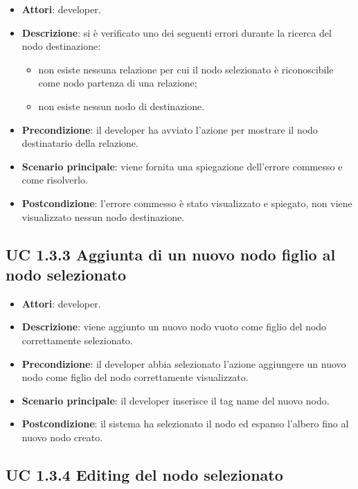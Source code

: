 		\begin{itemize}
			\item\textbf{Attori}: developer.
			\item\textbf{Descrizione}: si è verificato uno dei seguenti errori durante la ricerca del nodo destinazione:
			\begin{itemize}
				\item non esiste nessuna relazione per cui il nodo selezionato è riconoscibile come nodo partenza di una relazione;
				\item non esiste nessun nodo di destinazione.
			\end{itemize}
			\item\textbf{Precondizione}: il developer ha avviato l'azione per mostrare il nodo destinatario della relazione.
			\item\textbf{Scenario principale}: viene fornita una spiegazione dell'errore commesso e come risolverlo.
			\item\textbf{Postcondizione}: l'errore commesso è stato visualizzato e spiegato, non viene visualizzato nessun nodo destinazione.
		\end{itemize}
		
	\subsection{UC 1.3.3 Aggiunta di un nuovo nodo figlio al nodo selezionato}
		\label{subsec:XEUC1.3.3}
			
		\begin{itemize}
			\item\textbf{Attori}: developer.
			\item\textbf{Descrizione}: viene aggiunto un nuovo nodo vuoto come figlio del nodo correttamente selezionato.
			\item\textbf{Precondizione}: il developer abbia selezionato l'azione aggiungere un nuovo nodo come figlio del nodo correttamente visualizzato.
			\item\textbf{Scenario principale}: il developer inserisce il tag name del nuovo nodo.
			\item\textbf{Postcondizione}: il sistema ha selezionato il nodo ed espanso l'albero fino al nuovo nodo creato.
		\end{itemize}
		
	\subsection{UC 1.3.4 Editing del nodo selezionato}
		\label{subsec:XEUC1.3.4}
		
